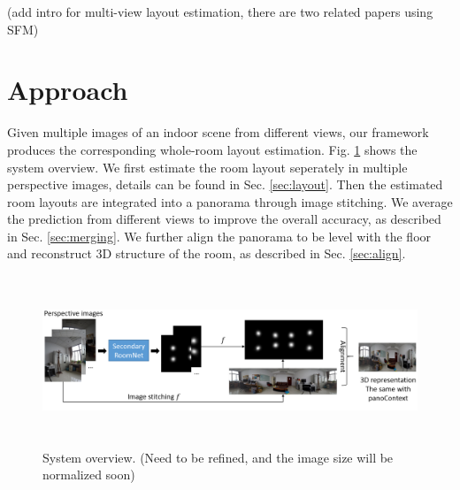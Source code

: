 (add intro for multi-view layout estimation, there are two related papers using SFM) 

\section{Approach}
Given multiple images of an indoor scene from different views, our framework produces the corresponding whole-room layout estimation. Fig. \ref{fig:overview} shows the system overview. We first estimate the room layout seperately in multiple perspective images, details can be found in Sec. \ref{sec:layout}. Then the estimated room layouts are integrated into a panorama through image stitching. We average the prediction from different views to improve the overall accuracy, as described in Sec. \ref{sec:merging}. We further align the panorama to be level with the floor and reconstruct 3D structure of the room, as described in Sec. \ref{sec:align}. 

\begin{figure}
	\includegraphics[height=2in, width=7in]{figs/ppline.png}
	\caption{System overview. (Need to be refined, and the image size will be normalized soon)}
	\label{fig:overview}
\end{figure}

